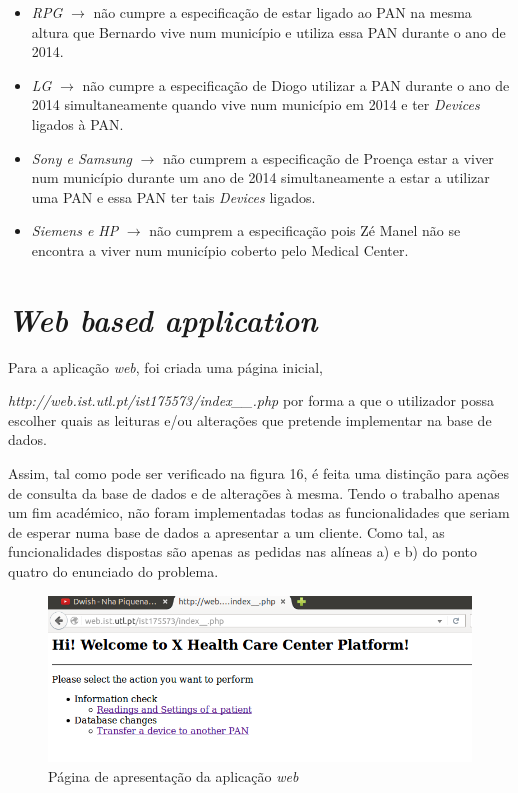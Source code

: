 \documentclass[a4paper]{article}
\begin{document}
	\begin{itemize}
	\item \textit{RPG} $\rightarrow$ não cumpre a especificação de estar ligado ao PAN na mesma
	altura que Bernardo vive num município e utiliza essa PAN durante o ano de 2014.
	
	\item \textit{LG} $\rightarrow$ não cumpre a especificação de Diogo utilizar a PAN durante
	o ano de 2014 simultaneamente quando vive num município em 2014 e ter
	\textit{Devices} ligados à PAN.
	
	\item \textit{Sony e Samsung} $\rightarrow$ não cumprem a especificação de Proença estar
	a viver num município durante um ano de 2014 simultaneamente a estar
	a utilizar uma PAN e essa PAN ter tais \textit{Devices} ligados.
	
	\item \textit{Siemens e HP} $\rightarrow$ não cumprem a especificação pois Zé Manel não
	se encontra a viver num município coberto pelo Medical Center.
	\end{itemize}		
	
\section{\textit{Web based application}}
Para a aplicação \textit{web}, foi criada uma página inicial,

\textit{http://web.ist.utl.pt/ist175573/index\_\_.php} por forma a que o utilizador possa escolher quais as leituras e/ou alterações que pretende implementar na base de dados.
 
Assim, tal como pode ser verificado na figura 16, é feita uma distinção para ações de consulta da base de dados e de alterações à mesma. Tendo o trabalho apenas um fim académico, não foram implementadas todas as funcionalidades que seriam de esperar numa base de dados a apresentar a um cliente. Como tal, as funcionalidades dispostas são apenas as pedidas nas alíneas a) e b) do ponto quatro do enunciado do problema.

\begin{figure}[ht!]
\centering
\includegraphics[scale=0.53]{index_php.png}
\caption{Página de apresentação da aplicação \textit{web}}
\end{figure}
	
\end{document}
